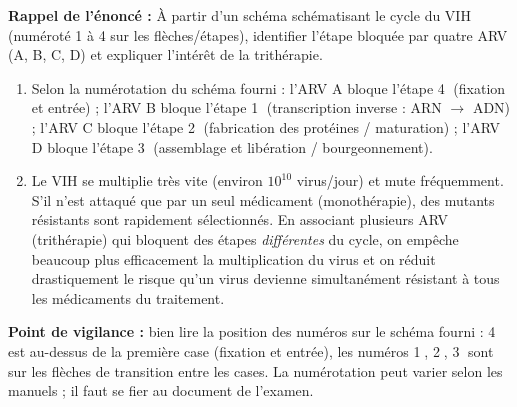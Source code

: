 \documentclass[11pt]{article}
\newcommand{\cle}[1]{{\popxbold\color{popdark}#1}}
\begin{document}
\begin{corrige}
\textbf{Rappel de l'énoncé :} À partir d'un schéma schématisant le cycle du VIH (numéroté 1 à 4 sur les flèches/étapes), identifier l'étape bloquée par quatre ARV (A, B, C, D) et expliquer l'intérêt de la trithérapie.
\tcblower
\begin{enumerate}
\item Selon la numérotation du schéma fourni : l'ARV A bloque l'étape \textcircled{4} (fixation et entrée) ; l'ARV B bloque l'étape \textcircled{1} (transcription inverse : ARN $\to$ ADN) ; l'ARV C bloque l'étape \textcircled{2} (fabrication des protéines / maturation) ; l'ARV D bloque l'étape \textcircled{3} (assemblage et libération / bourgeonnement).
\item Le VIH se multiplie très vite (environ $10^{10}$ virus/jour) et mute fréquemment. S'il n'est attaqué que par un seul médicament (monothérapie), des mutants résistants sont rapidement sélectionnés. En associant plusieurs ARV (\cle{trithérapie}) qui bloquent des étapes \emph{différentes} du cycle, on empêche beaucoup plus efficacement la multiplication du virus et on réduit drastiquement le risque qu'un virus devienne simultanément résistant à tous les médicaments du traitement.
\end{enumerate}
\textbf{Point de vigilance :} bien lire la position des numéros sur le schéma fourni : \textcircled{4} est au-dessus de la première case (fixation et entrée), les numéros \textcircled{1}, \textcircled{2}, \textcircled{3} sont sur les flèches de transition entre les cases. La numérotation peut varier selon les manuels ; il faut se fier au document de l'examen.
\end{corrige}
\end{document}
